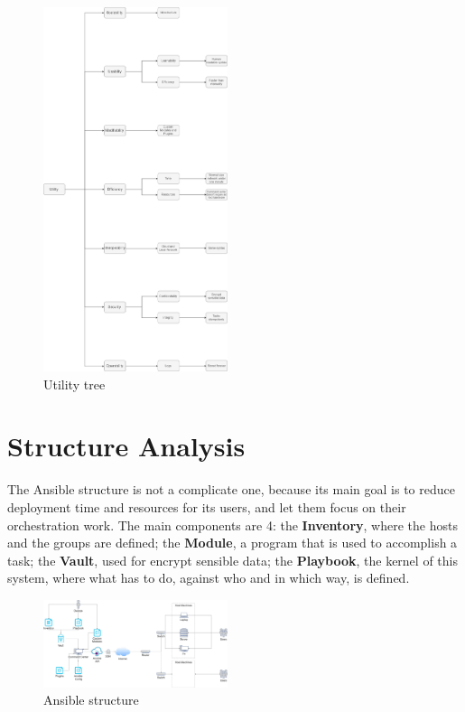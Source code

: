 \documentclass[conference]{IEEEtran}
\begin{document}
\begin{figure}[h]
\includegraphics[width=0.48\textwidth]{UtilityTree.png}
\caption{Utility tree}
\label{utility}
\end{figure}
\section{Structure Analysis}
\label{structure}
The Ansible structure is not a complicate one, because its main goal is to reduce deployment time and resources for its users, and let them focus on their orchestration work. The main components are 4: the \textbf{Inventory}, where the hosts and the groups are defined; the \textbf{Module}, a program that is used to accomplish a task; the \textbf{Vault}, used for encrypt sensible data; the \textbf{Playbook}, the kernel of this system, where what has to do, against who and in which way, is defined.\\
\begin{figure}[h]
\includegraphics[width=0.48\textwidth]{Schema.jpg}
\caption{Ansible structure}
\end{figure}
\newpage
\end{document}
